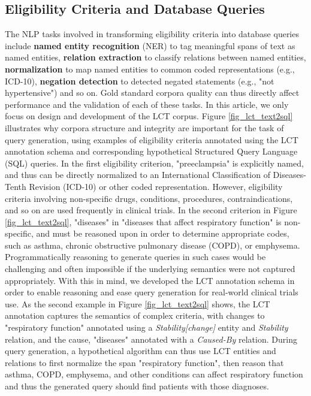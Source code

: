 \documentclass[../main.tex]{subfiles}
\begin{document}
\subsection*{Eligibility Criteria and Database Queries}
\noindent The NLP tasks involved in transforming eligibility criteria into database queries include \textbf{named entity recognition} (NER) to tag meaningful spans of text as named entities, \textbf{relation extraction} to classify relations between named entities, \textbf{normalization} to map named entities to common coded representations (e.g., ICD-10), \textbf{negation detection} to detected negated statements (e.g., "not hypertensive") and so on. Gold standard corpora quality can thus directly affect performance and the validation of each of these tasks. In this article, we only focus on design and development of the LCT corpus. Figure \ref{fig_lct_text2sql} illustrates why corpora structure and integrity are important for the task of query generation, using examples of eligibility criteria annotated using the LCT annotation schema and corresponding hypothetical Structured Query Language (SQL) queries. In the first eligibility criterion, "preeclampsia" is explicitly named, and thus can be directly normalized to an International Classification of Diseases-Tenth Revision (ICD-10) or other coded representation. However, eligibility criteria involving non-specific drugs, conditions, procedures, contraindications, and so on are used frequently in clinical trials. In the second criterion in Figure \ref{fig_lct_text2sql}, "diseases" in "diseases that affect respiratory function" is non-specific, and must be reasoned upon in order to determine appropriate codes, such as asthma, chronic obstructive pulmonary disease (COPD), or emphysema.  Programmatically reasoning to generate queries in such cases would be challenging and often impossible if the underlying semantics were not captured appropriately. With this in mind, we developed the LCT annotation schema in order to enable reasoning and ease query generation for real-world clinical trials use. As the second example in Figure \ref{fig_lct_text2sql} shows, the LCT annotation captures the semantics of complex criteria, with changes to "respiratory function" annotated using a \textit{Stability[change]} entity and \textit{Stability} relation, and the cause, "diseases" annotated with a \textit{Caused-By} relation. During query generation, a hypothetical algorithm can thus use LCT entities and relations to first normalize the span "respiratory function", then reason that asthma, COPD, emphysema, and other conditions can affect respiratory function and thus the generated query should find patients with those diagnoses.
\end{document}
